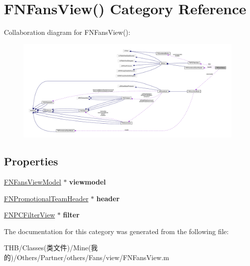 \hypertarget{category_f_n_fans_view_07_08}{}\section{F\+N\+Fans\+View() Category Reference}
\label{category_f_n_fans_view_07_08}


Collaboration diagram for F\+N\+Fans\+View()\+:\nopagebreak
\begin{figure}[H]
\begin{center}
\leavevmode
\includegraphics[width=350pt]{category_f_n_fans_view_07_08__coll__graph}
\end{center}
\end{figure}
\subsection*{Properties}
\begin{DoxyCompactItemize}
\item 
\mbox{\label{category_f_n_fans_view_07_08_a7a963f73b8c794bbcf1162af4096f033}} 
\mbox{\hyperlink{interface_f_n_fans_view_model}{F\+N\+Fans\+View\+Model}} $\ast$ {\bfseries viewmodel}
\item 
\mbox{\label{category_f_n_fans_view_07_08_ae8adff6cb1a12bbacfb3c4157cc2121e}} 
\mbox{\hyperlink{interface_f_n_promotional_team_header}{F\+N\+Promotional\+Team\+Header}} $\ast$ {\bfseries header}
\item 
\mbox{\label{category_f_n_fans_view_07_08_a4d6622a13f5049cd3c0b66e34e48a976}} 
\mbox{\hyperlink{interface_f_n_p_c_filter_view}{F\+N\+P\+C\+Filter\+View}} $\ast$ {\bfseries filter}
\end{DoxyCompactItemize}


The documentation for this category was generated from the following file\+:\begin{DoxyCompactItemize}
\item 
T\+H\+B/\+Classes(类文件)/\+Mine(我的)/\+Others/\+Partner/others/\+Fans/view/F\+N\+Fans\+View.\+m\end{DoxyCompactItemize}

